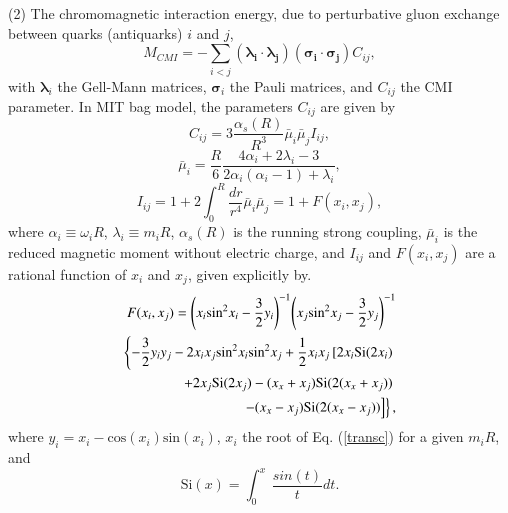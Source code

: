 \documentclass[12pt,onecolumn,floatfix,nofootinbib]{revtex4}
\begin{document}
(2) The chromomagnetic interaction energy, due to perturbative gluon
exchange between quarks (antiquarks) $i$ and $j$,
\begin{equation}
M_{CMI}=-\sum_{i<j}\left( \boldsymbol{\lambda _{i}}\cdot \boldsymbol{\lambda
_{j}}\right) \left( \boldsymbol{\sigma _{i}}\cdot \boldsymbol{\sigma _{j}}%
\right) C_{ij},  \label{CMI}
\end{equation}%
with $\boldsymbol{\lambda }_{i}$ the Gell-Mann matrices, $\boldsymbol{\sigma
}_{i}$ the Pauli matrices, and $C_{ij}$ the CMI parameter. In MIT bag model,
the parameters $C_{ij}$ are given by
\begin{equation}
C_{ij}=3\frac{\alpha _{s}\left( R\right) }{R^{3}}\bar{\mu}_{i}\bar{\mu}%
_{j}I_{ij},  \label{Cij}
\end{equation}%
\begin{equation}
\bar{\mu}_{i}=\frac{R}{6}\frac{4\alpha _{i}+2\lambda _{i}-3}{2\alpha
_{i}\left( \alpha _{i}-1\right) +\lambda _{i}},  \label{muBari}
\end{equation}%
\begin{equation}
I_{ij}=1+2\int_{0}^{R}\frac{dr}{r^{4}}\bar{\mu}_{i}\bar{\mu}%
_{j}=1+F(x_{i},x_{j}),  \label{Iij}
\end{equation}%
where $\alpha _{i}\equiv \omega _{i}R$, $\lambda _{i}\equiv m_{i}R$, $\alpha
_{s}\left( R\right) $ is the running strong coupling, $\bar{\mu}_{i}$ is the
reduced magnetic moment without electric charge, and $I_{ij}$ and $%
F(x_{i},x_{j})$ are a rational function of $x_{i}$ and $x_{j}$, given
explicitly by\cite{DeGrand:1975cf}.
\begin{equation}
\begin{aligned} F(x_{i}, x_{j})={\left(x_{i} {\rm
sin}^{2}x_{i}-\frac{3}{2}y_{i}\right)}^{-1} {\left(x_{j} {\rm
sin^{2}}x_{j}-\frac{3}{2}y_{j}\right)}^{-1} \\
\left\{-\frac{3}{2}y_{i}y_{j}-2x_{i}x_{j} {\rm sin}^{2}x_{i} {\rm
sin}^{2}x_{j} +\frac{1}{2}x_{i}x_{j}\left[2x_{i} {\rm Si}(2x_{i})
\right.\right.\\ \left.\left. +2x_{j} {\rm Si}(2x_{j}) -(x_{x}+x_{j}) {\rm
Si}(2(x_{x}+x_{j})) \right.\right.\\ \left.\left. -(x_{x}-x_{j}) {\rm
Si}(2(x_{x}-x_{j})) \right] \right\}, \end{aligned}  \label{F}
\end{equation}%
where $y_{i}=x_{i}-\mathrm{cos}(x_{i})\mathrm{sin}(x_{i})$, $x_{i}$ the root
of Eq. (\ref{transc}) for a given $m_{i}R$, and
\begin{equation}
\mathrm{Si}(x)=\int_{0}^{x}\ \frac{sin(t)}{t}dt.
\end{equation}
\end{document}

